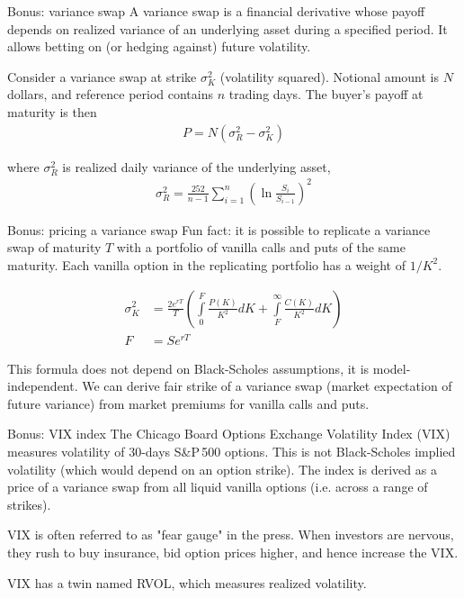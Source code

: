 \documentclass{beamer}
\begin{document}
\begin{frame}{Bonus: variance swap}
\justify
A \alert{variance swap} is a financial derivative whose payoff depends on realized variance of an underlying asset during a specified period. It allows betting on (or hedging against) future volatility.

\justify
Consider a variance swap at strike $\sigma_K^2$ (volatility squared). Notional amount is $N$ dollars, and reference period contains $n$ trading days. The buyer's payoff at maturity is then
\begin{align*}
P = N(\sigma_R^2 - \sigma_K^2)
\end{align*}

where $\sigma_R^2$ is realized daily variance of the underlying asset,
\begin{align*}
\sigma_R^2 = \frac{252}{n-1}\sum\limits_{i=1}^{n}\left(\ln\frac{S_i}{S_{i-1}}\right)^2
\end{align*}
\end{frame}



\begin{frame}{Bonus: pricing a variance swap}
\justify
Fun fact: it is possible to replicate a variance swap of maturity $T$ with a portfolio of vanilla calls and puts of the same maturity. Each vanilla option in the replicating portfolio has a weight of $1/K^2$.

\begin{align*}
\sigma^2_K &= \frac{2e^{rT}}{T}\left(
\int\limits_{0}^{F}\frac{P(K)}{K^2}dK + 
\int\limits_{F}^{\infty}\frac{C(K)}{K^2}dK
\right) \\
F &= Se^{rT}
\end{align*}

\justify
This formula does not depend on Black-Scholes assumptions, it is model-independent. We can derive fair strike of a variance swap (market expectation of future variance) from market premiums for vanilla calls and puts.
\end{frame}



\begin{frame}{Bonus: VIX index}
\justify
The Chicago Board Options Exchange Volatility Index (\alert{VIX}) measures volatility of 30-days S\&P\,500 options. This is not Black-Scholes implied volatility (which would depend on an option strike). The index is derived as a price of a variance swap from all liquid vanilla options (i.e. across a range of strikes).

\justify
VIX is often referred to as "fear gauge" in the press. When investors are nervous, they rush to buy insurance, bid option prices higher, and hence increase the VIX.

\justify
VIX has a twin named RVOL, which measures realized volatility.
\end{frame}
\end{document}
